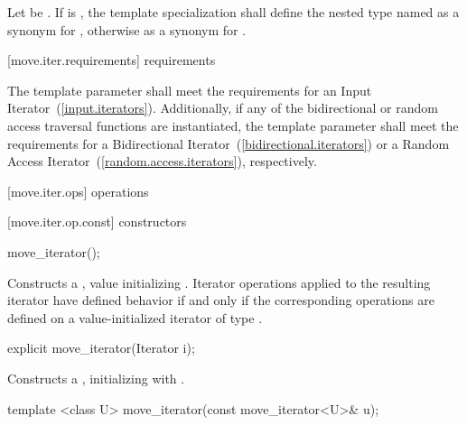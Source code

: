 \pnum
Let  be .
If  is ,
the template specialization  shall define
the nested type named  as a synonym for
,
otherwise as a synonym for .

[move.iter.requirements]{ requirements}

\pnum
The template parameter  shall meet
the requirements for an Input Iterator~(\ref{input.iterators}).
Additionally, if any of the bidirectional or random access traversal
functions are instantiated, the template parameter shall meet the
requirements for a Bidirectional Iterator~(\ref{bidirectional.iterators})
or a Random Access Iterator~(\ref{random.access.iterators}), respectively.

[move.iter.ops]{ operations}

[move.iter.op.const]{ constructors}

%
\begin{itemdecl}
move_iterator();
\end{itemdecl}

\begin{itemdescr}
\pnum
\effects Constructs a , value
initializing . Iterator operations applied to the resulting
iterator have defined behavior if and only if the corresponding operations are defined
on a value-initialized iterator of type .
\end{itemdescr}


%
\begin{itemdecl}
explicit move_iterator(Iterator i);
\end{itemdecl}

\begin{itemdescr}
\pnum
\effects Constructs a , initializing
 with .
\end{itemdescr}


%
\begin{itemdecl}
template <class U> move_iterator(const move_iterator<U>& u);
\end{itemdecl}

